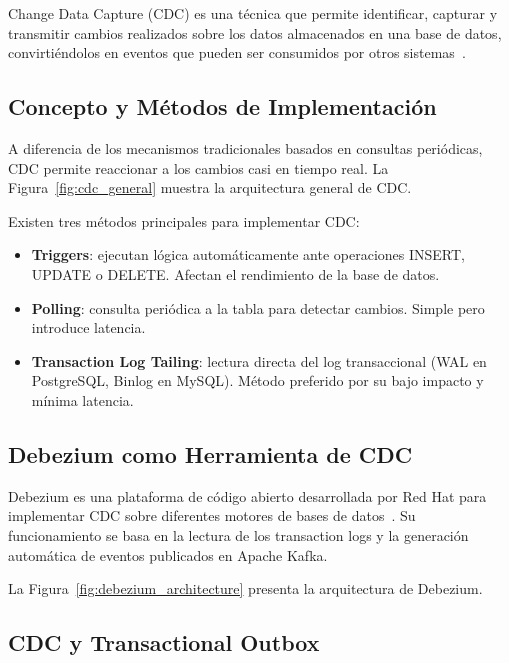 Change Data Capture (CDC) es una técnica que permite identificar, capturar y transmitir cambios realizados sobre los datos almacenados en una base de datos, convirtiéndolos en eventos que pueden ser consumidos por otros sistemas~\parencite{kleppmann2017}.

\subsection{Concepto y Métodos de Implementación}

A diferencia de los mecanismos tradicionales basados en consultas periódicas, CDC permite reaccionar a los cambios casi en tiempo real. La Figura~\ref{fig:cdc_general} muestra la arquitectura general de CDC.



Existen tres métodos principales para implementar CDC:

\begin{itemize}
    \item \textbf{Triggers}: ejecutan lógica automáticamente ante operaciones INSERT, UPDATE o DELETE. Afectan el rendimiento de la base de datos.
    \item \textbf{Polling}: consulta periódica a la tabla para detectar cambios. Simple pero introduce latencia.
    \item \textbf{Transaction Log Tailing}: lectura directa del log transaccional (WAL en PostgreSQL, Binlog en MySQL). Método preferido por su bajo impacto y mínima latencia.
\end{itemize}

\subsection{Debezium como Herramienta de CDC}

Debezium es una plataforma de código abierto desarrollada por Red Hat para implementar CDC sobre diferentes motores de bases de datos~\parencite{debezium2020}. Su funcionamiento se basa en la lectura de los transaction logs y la generación automática de eventos publicados en Apache Kafka.

La Figura~\ref{fig:debezium_architecture} presenta la arquitectura de Debezium.



\subsection{CDC y Transactional Outbox}

